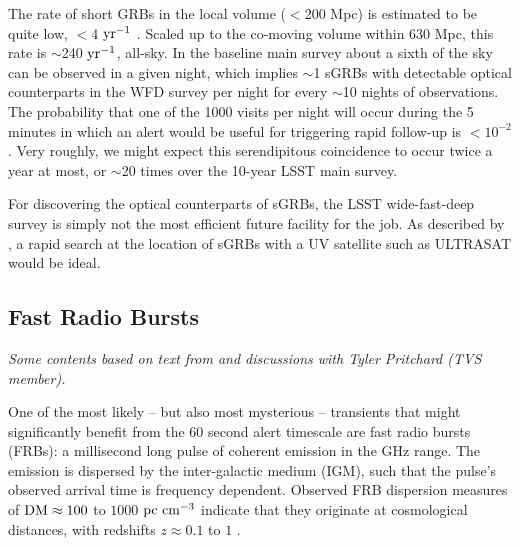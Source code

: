\documentclass[DM,lsstdraft,authoryear,toc]{lsstdoc}
\begin{document}
The rate of short GRBs in the local volume ($<$200 Mpc) is estimated to be quite low, $<$4 $\rm yr^{-1}$ \citep{2019arXiv190800100M}.
Scaled up to the co-moving volume within 630 Mpc, this rate is $\sim$240 $\rm yr^{-1}$, all-sky.
In the baseline main survey about a sixth of the sky can be observed in a given night, which implies $\sim$1 sGRBs with detectable optical counterparts in the WFD survey per night for every $\sim$10 nights of observations.
The probability that one of the 1000 visits per night will occur during the 5 minutes in which an alert would be useful for triggering rapid follow-up is $<10^{-2}$.
Very roughly, we might expect this serendipitous coincidence to occur twice a year at most, or $\sim$20 times over the 10-year LSST main survey.


For discovering the optical counterparts of sGRBs, the LSST wide-fast-deep survey is simply not the most efficient future facility for the job.
As described by \citet{2018MNRAS.473..576G}, a rapid search at the location of sGRBs with a UV satellite such as ULTRASAT would be ideal.


\subsection{Fast Radio Bursts}\label{ssec:latency_frb}

{\it Some contents based on text from and discussions with Tyler Pritchard (TVS member).}

One of the most likely -- but also most mysterious -- transients that might significantly benefit from the $60$ second alert timescale are fast radio bursts (FRBs): a millisecond long pulse of coherent emission in the GHz range.
The emission is dispersed by the inter-galactic medium (IGM), such that the pulse's observed arrival time is frequency dependent.
Observed FRB dispersion measures of $\rm{DM}\approx100$ to $1000$ $\rm pc\ cm^{-3}$ indicate that they originate at cosmological distances, with redshifts $z\approx0.1$ to $1$ \citep{2018Natur.562..386S}. 
\end{document}

